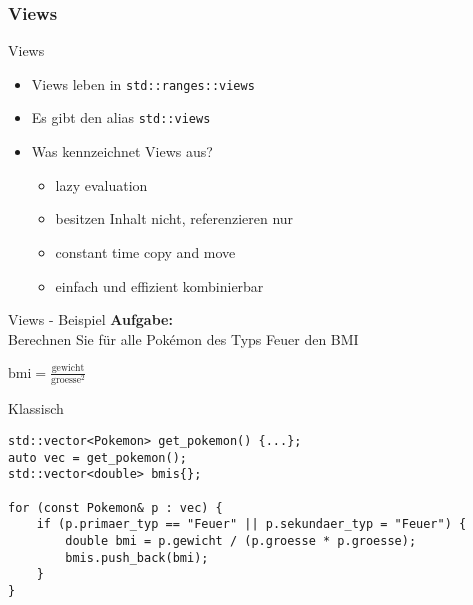 \subsubsection{Views}

\begin{frame}{Views}
    \begin{itemize}
        \item<1-> Views leben in \texttt{std::ranges::views}
        \item<2-> Es gibt den alias \texttt{std::views}
        \item<3-> Was kennzeichnet Views aus?
            \begin{itemize}
                \item<4-> lazy evaluation
                \item<5-> besitzen Inhalt nicht, referenzieren nur
                \item<6-> constant time copy and move
                \item<7-> einfach und effizient kombinierbar
            \end{itemize}
    \end{itemize}
\end{frame}


\begin{frame}{Views - Beispiel}
    \textbf{Aufgabe:}\\
    Berechnen Sie für alle Pokémon des Typs Feuer den BMI

    \vspace{2.5em}

    \begin{center}
        $\text{bmi} = \frac{\text{gewicht}}{\text{groesse}^2}$
    \end{center}
\end{frame}

\begin{frame}[fragile]{Klassisch}
    \begin{verbatim}
std::vector<Pokemon> get_pokemon() {...};
auto vec = get_pokemon();
std::vector<double> bmis{};

for (const Pokemon& p : vec) {
    if (p.primaer_typ == "Feuer" || p.sekundaer_typ = "Feuer") {
        double bmi = p.gewicht / (p.groesse * p.groesse);
        bmis.push_back(bmi);
    }
}
    \end{verbatim}
\end{frame}

